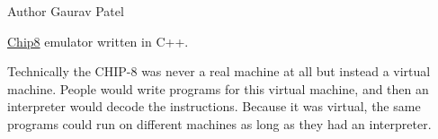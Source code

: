 \begin{DoxyAuthor}{Author}
Gaurav Patel
\end{DoxyAuthor}
\mbox{\hyperlink{classChip8}{Chip8}} emulator written in C++.

Technically the CHIP-\/8 was never a real machine at all but instead a virtual machine. People would write programs for this virtual machine, and then an interpreter would decode the instructions. Because it was virtual, the same programs could run on different machines as long as they had an interpreter. 